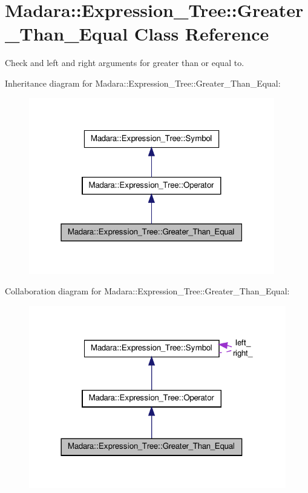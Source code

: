 \hypertarget{classMadara_1_1Expression__Tree_1_1Greater__Than__Equal}{
\section{Madara::Expression\_\-Tree::Greater\_\-Than\_\-Equal Class Reference}
\label{db/d82/classMadara_1_1Expression__Tree_1_1Greater__Than__Equal}
}


Check and left and right arguments for greater than or equal to.  




Inheritance diagram for Madara::Expression\_\-Tree::Greater\_\-Than\_\-Equal:
\nopagebreak
\begin{figure}[H]
\begin{center}
\leavevmode
\includegraphics[width=304pt]{d0/d84/classMadara_1_1Expression__Tree_1_1Greater__Than__Equal__inherit__graph}
\end{center}
\end{figure}


Collaboration diagram for Madara::Expression\_\-Tree::Greater\_\-Than\_\-Equal:
\nopagebreak
\begin{figure}[H]
\begin{center}
\leavevmode
\includegraphics[width=318pt]{d5/dfe/classMadara_1_1Expression__Tree_1_1Greater__Than__Equal__coll__graph}
\end{center}
\end{figure}
